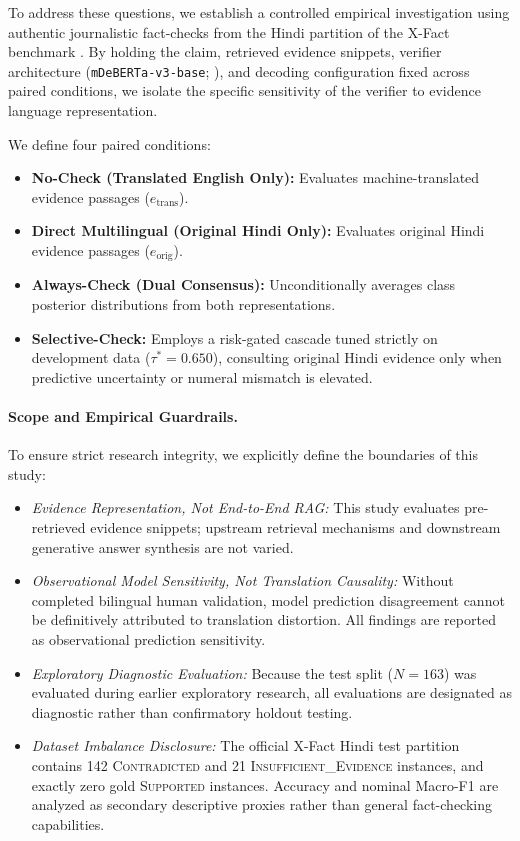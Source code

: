 To address these questions, we establish a controlled empirical investigation using authentic journalistic fact-checks from the Hindi partition of the X-Fact benchmark \citep{gupta-srikumar-2021-xfact}. By holding the claim, retrieved evidence snippets, verifier architecture (\texttt{mDeBERTa-v3-base}; \citealt{he-etal-2021-deberta,laurer-etal-2024-less}), and decoding configuration fixed across paired conditions, we isolate the specific sensitivity of the verifier to evidence language representation.

We define four paired conditions:
\begin{itemize}
    \item \textbf{No-Check (Translated English Only):} Evaluates machine-translated evidence passages ($e_{\text{trans}}$).
    \item \textbf{Direct Multilingual (Original Hindi Only):} Evaluates original Hindi evidence passages ($e_{\text{orig}}$).
    \item \textbf{Always-Check (Dual Consensus):} Unconditionally averages class posterior distributions from both representations.
    \item \textbf{Selective-Check:} Employs a risk-gated cascade tuned strictly on development data ($\tau^*=0.650$), consulting original Hindi evidence only when predictive uncertainty or numeral mismatch is elevated.
\end{itemize}

\paragraph{Scope and Empirical Guardrails.}
To ensure strict research integrity, we explicitly define the boundaries of this study:
\begin{itemize}
    \item \emph{Evidence Representation, Not End-to-End RAG:} This study evaluates pre-retrieved evidence snippets; upstream retrieval mechanisms and downstream generative answer synthesis are not varied.
    \item \emph{Observational Model Sensitivity, Not Translation Causality:} Without completed bilingual human validation, model prediction disagreement cannot be definitively attributed to translation distortion. All findings are reported as observational prediction sensitivity.
    \item \emph{Exploratory Diagnostic Evaluation:} Because the test split ($N=163$) was evaluated during earlier exploratory research, all evaluations are designated as diagnostic rather than confirmatory holdout testing.
    \item \emph{Dataset Imbalance Disclosure:} The official X-Fact Hindi test partition contains 142 \textsc{Contradicted} and 21 \textsc{Insufficient\_Evidence} instances, and exactly zero gold \textsc{Supported} instances. Accuracy and nominal Macro-F1 are analyzed as secondary descriptive proxies rather than general fact-checking capabilities.
\end{itemize}

